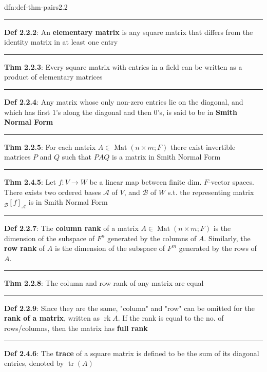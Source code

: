 \documentclass[landscape, 8pt]{extarticle}
\DeclareMathOperator{\Mat}{Mat}
\DeclareMathOperator{\rk}{rk}
\DeclareMathOperator{\Tr}{tr}
\begin{document}
\begin{multicols}{3}
\begin{dfn}{dfn:def-thm-pairs}{2.2}
    \vspace{-5pt}
    \noindent\rule{\textwidth}{0.6pt}
    \textbf{Def 2.2.2}: An \textbf{elementary matrix} is any square matrix that differs from the identity matrix in at least one entry

    \vspace{-5pt}
    \noindent\rule{\textwidth}{0.2pt}
    \textbf{Thm 2.2.3}: Every square matrix with entries in a field can be written as a product of elementary matrices

    \noindent\rule{\textwidth}{0.6pt}
    \textbf{Def 2.2.4}: Any matrix whose only non-zero entries lie on the diagonal, and which has first $1$'s along the diagonal and then $0$'s, is said to be in \textbf{Smith Normal Form}

    \vspace{-5pt}
    \noindent\rule{\textwidth}{0.2pt}
    \textbf{Thm 2.2.5}: For each matrix $A\in \Mat(n \times m; F)$ there exist invertible matrices $P$ and $Q$ such that $PAQ$ is a matrix in Smith Normal Form
    
    \vspace{-5pt}
    \noindent\rule{\textwidth}{0.2pt}
    \textbf{Thm 2.4.5}: Let $f : V \to W$ be a linear map between finite dim. $F$-vector spaces. There exists two ordered bases $\mathcal{A}$ of $V$, and $\mathcal{B}$ of $W$ s.t. the representing matrix ${}_{\mathcal{B}}[f]_{\mathcal{A}}$ is in Smith Normal Form

    \noindent\rule{\textwidth}{0.6pt}
    \textbf{Def 2.2.7}: The \textbf{column rank} of a matrix $A\in \Mat(n \times m; F)$ is the dimension of the subspace of $F^{n}$ generated by the columns of $A$. Similarly, the \textbf{row rank} of $A$ is the dimension of the subspace of $F^{m}$ generated by the rows of $A$.

    \vspace{-5pt}
    \noindent\rule{\textwidth}{0.2pt}
    \textbf{Thm 2.2.8}: The column and row rank of any matrix are equal

    \noindent\rule{\textwidth}{0.6pt}
    \textbf{Def 2.2.9}: Since they are the same, "column" and "row" can be omitted for the \textbf{rank of a matrix}, written as $\rk A$. If the rank is equal to the no. of rows/columns, then the matrix has \textbf{full rank}

    \noindent\rule{\textwidth}{0.6pt}
    \textbf{Def 2.4.6}: The \textbf{trace} of a square matrix is defined to be the sum of its diagonal entries, denoted by $\Tr(A)$
\end{dfn}


\end{multicols}
\end{document}
